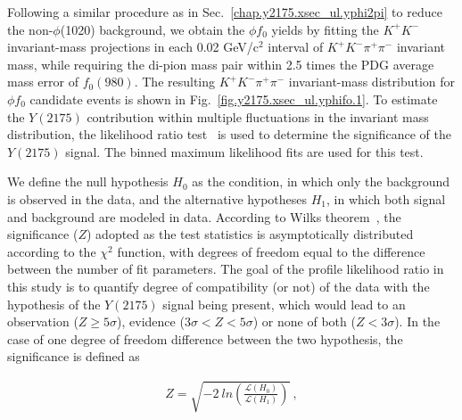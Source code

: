 Following a similar procedure as in Sec.~\ref{chap.y2175.xsec_ul.yphi2pi} to reduce the non-$\phi$(1020) background, we obtain the $\phi f_{0}$ yields by fitting the $K^{+}K^{-}$ invariant-mass projections in each 0.02 GeV/c$^{2}$ interval of $K^{+}K^{-}\pi^{+}\pi^{-}$ invariant mass, while requiring the di-pion mass pair within 2.5 times the PDG average mass error of $f_0(980)$. The resulting $K^{+}K^{-}\pi^{+}\pi^{-}$ invariant-mass distribution for $\phi f_{0}$ candidate events is shown in Fig.~\ref{fig.y2175.xsec_ul.yphifo.1}. To estimate the $Y(2175)$ contribution within multiple fluctuations in the invariant mass distribution, the likelihood ratio test~\cite{Cow11} is used to determine the significance of the $Y(2175)$ signal. The binned maximum likelihood fits are used for this test.
~\par We define the null hypothesis $H_{0}$ as the condition, in which only the background is observed in the data, and the alternative hypotheses $H_{1}$, in which both signal and background are modeled in data. According to Wilks theorem~\cite{Wil01}, the significance ($Z$) adopted as the test statistics is asymptotically distributed according to the $\chi^{2}$ function, with degrees of freedom equal to the difference between the number of fit parameters. The goal of the profile likelihood ratio in this study is to quantify degree of compatibility (or not) of the data with the hypothesis of the $Y(2175)$ signal being present, which would lead to an observation ($Z \geq 5\sigma$), evidence ($3\sigma < Z < 5\sigma$) or none of both ($Z < 3\sigma$). In the case of one degree of freedom difference between the two hypothesis, the significance is defined as

\begin{equation}
    \label{eq.y2175.xsec_ul.yphifo}
    \begin{aligned}
        Z = \sqrt{-2~ln\left(\frac{\mathcal{L}(H_{0})}{\mathcal{L}(H_{1})}\right)}~,
    \end{aligned}
\end{equation}

